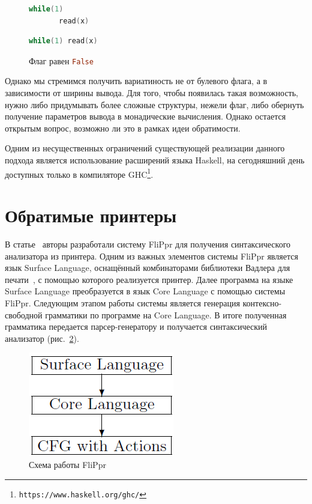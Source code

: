 \begin{figure}[h]
  \centering
  \begin{minipage}[h]{0.4\textwidth}
    \begin{lstlisting}[language = C]
    while(1)
       read(x)
    \end{lstlisting}
    \caption{Флаг равен \lstinline[language=Haskell]{True}}
    \label{True}
  \end{minipage}
  \hfill
  \begin{minipage}[h]{0.4\textwidth}
    \begin{lstlisting}[language = C]
    while(1) read(x)
    \end{lstlisting}
    \caption{Флаг равен \lstinline[language=Haskell]{False}}
    \label{False}
  \end{minipage}
\end{figure}


Однако мы стремимся получить вариатиность не от булевого флага, а в зависимости от ширины вывода. 
Для того, чтобы появилась такая возможность, нужно либо придумывать более сложные структуры, 
нежели флаг, либо обернуть получение параметров вывода в монадические вычисления. Однако
остается открытым вопрос, возможно ли это в рамках идеи обратимости.

Одним из несущественных ограничений существующей реализации данного подхода является
использование расширений языка Haskell, на сегодняшний день доступных только в компиляторе
GHC\footnote{\texttt{https://www.haskell.org/ghc/}}.

\section{Обратимые принтеры}

В статье~\cite{Matsuda} авторы разработали систему FliPpr для получения синтаксического 
анализатора из принтера. Одним из важных элементов системы FliPpr является язык Surface Language, 
оснащённый комбинаторами библиотеки Вадлера для печати~\cite{WadlerPrinter}, с помощью которого 
реализуется принтер. Далее программа на языке Surface Language преобразуется в язык Core Language 
с помощью системы FliPpr. Следующим этапом работы системы является генерация контексно-свободной 
грамматики по программе на Core Language. В итоге полученная грамматика передается 
парсер-генератору и получается синтаксический анализатор (рис.~\ref{FliPpr}).

\begin{figure}[h]
\centering
\includegraphics[scale=0.5]{Aliev/FliPprScheme.png}
\caption{Схема работы FliPpr}
\label{FliPpr}
\end{figure}

